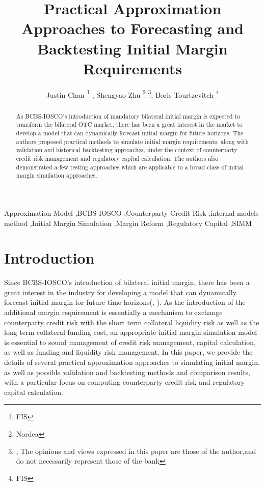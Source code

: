 \documentclass[preprint,12pt]{elsarticle}
\begin{document}
\begin{frontmatter}


\title{Practical Approximation Approaches to Forecasting and Backtesting Initial Margin Requirements}

\author{Justin Chan \footnote{FIS} , Shengyao Zhu \footnote{Nordea} \footnote{, The opinions and views expressed in this paper are those of the author,and do not necessarily represent those of the bank}, Boris Tourtzevitch \footnote{FIS}}

\address{}

\begin{abstract}
As BCBS-IOSCO's introduction of mandatory bilateral initial margin is expected to transform the bilateral OTC market, there has been a great interest in the market to develop a model that can dynamically forecast initial margin for future horizons. The authors proposed practical methods to simulate initial margin requirements, along with validation and historical backtesting approaches, under the context of counterparty credit risk management and regulatory capital calculation. The authors also demonstrated a few testing approaches which are applicable to a broad class of initial margin simulation approaches.

\end{abstract}

\begin{keyword}
Approximation Model \sep BCBS-IOSCO \sep Counterparty Credit Risk \sep internal models method \sep Initial Margin Simulation \sep Margin Reform \sep Regulatory Capital \sep SIMM

\end{keyword}

\end{frontmatter}


\section{Introduction}

Since BCBS-IOSCO's introduction of bilateral initial margin, there has been a great interest in the industry for developing a model that can dynamically forecast initial margin for future time horizons(\cite{anfuso2016sound}, \cite{andersen2016rethinking}). As the introduction of the additional margin requirement is essentially a mechanism to exchange counterparty credit risk with the short term collateral liquidity risk as well as the long term collateral funding cost, an appropriate initial margin simulation model is essential to sound management of credit risk management, capital calculation, as well as funding and liquidity risk management. In this paper, we provide the details of several practical approximation approaches to simulating initial margin, as well as possible validation and backtesting methods and comparison results, with a particular focus on computing counterparty credit risk and regulatory capital calculation.
\end{document}

